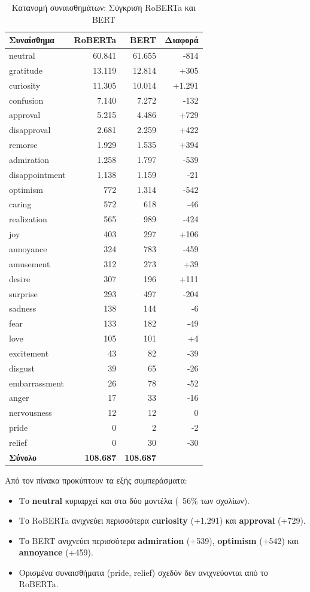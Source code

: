 \documentclass[a4paper,11pt,oneside,openany]{ioniothesis}
\begin{document}
\begin{table}[H]
\centering
\caption{Κατανομή συναισθημάτων: Σύγκριση RoBERTa και BERT}
\label{tab:emotion_distribution}
\small
\begin{tabular}{@{}lrrr@{}}
\toprule
\textbf{Συναίσθημα} & \textbf{RoBERTa} & \textbf{BERT} & \textbf{Διαφορά} \\
\midrule
neutral & 60.841 & 61.655 & -814 \\
gratitude & 13.119 & 12.814 & +305 \\
curiosity & 11.305 & 10.014 & +1.291 \\
confusion & 7.140 & 7.272 & -132 \\
approval & 5.215 & 4.486 & +729 \\
disapproval & 2.681 & 2.259 & +422 \\
remorse & 1.929 & 1.535 & +394 \\
admiration & 1.258 & 1.797 & -539 \\
disappointment & 1.138 & 1.159 & -21 \\
optimism & 772 & 1.314 & -542 \\
caring & 572 & 618 & -46 \\
realization & 565 & 989 & -424 \\
joy & 403 & 297 & +106 \\
annoyance & 324 & 783 & -459 \\
amusement & 312 & 273 & +39 \\
desire & 307 & 196 & +111 \\
surprise & 293 & 497 & -204 \\
sadness & 138 & 144 & -6 \\
fear & 133 & 182 & -49 \\
love & 105 & 101 & +4 \\
excitement & 43 & 82 & -39 \\
disgust & 39 & 65 & -26 \\
embarrassment & 26 & 78 & -52 \\
anger & 17 & 33 & -16 \\
nervousness & 12 & 12 & 0 \\
pride & 0 & 2 & -2 \\
relief & 0 & 30 & -30 \\
\midrule
\textbf{Σύνολο} & \textbf{108.687} & \textbf{108.687}  \\
\bottomrule
\end{tabular}
\end{table}

Από τον πίνακα προκύπτουν τα εξής συμπεράσματα:
\begin{itemize}
    \item Το \textbf{neutral} κυριαρχεί και στα δύο μοντέλα (~56\% των σχολίων).
    \item Το RoBERTa ανιχνεύει περισσότερα \textbf{curiosity} (+1.291) και \textbf{approval} (+729).
    \item Το BERT ανιχνεύει περισσότερα \textbf{admiration} (+539), \textbf{optimism} (+542) και \textbf{annoyance} (+459).
    \item Ορισμένα συναισθήματα (pride, relief) σχεδόν δεν ανιχνεύονται από το RoBERTa.
\end{itemize}
\end{document}
